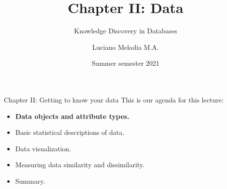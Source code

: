 \documentclass[aspectratio=169,t]{beamer}
\title[KDD]{Chapter II: Data}
\subtitle{Knowledge Discovery in Databases}
\author[L.~Melodia]{Luciano Melodia M.A.}
\institute[Department]{Evolutionary Data Management, Friedrich-Alexander University Erlangen-Nürnberg}
\date{Summer semester 2021}
\begin{document}

  \maketitle

  { 
    \begin{frame}{Chapter II: Getting to know your data}
    This is our agenda for this lecture:
        \begin{itemize}
            \item \textbf{Data objects and attribute types.}
            \item Basic statistical descriptions of data.
            \item Data visualization.
            \item Measuring data similarity and dissimilarity.
            \item Summary.
        \end{itemize}
    \end{frame}
  }
\end{document}
